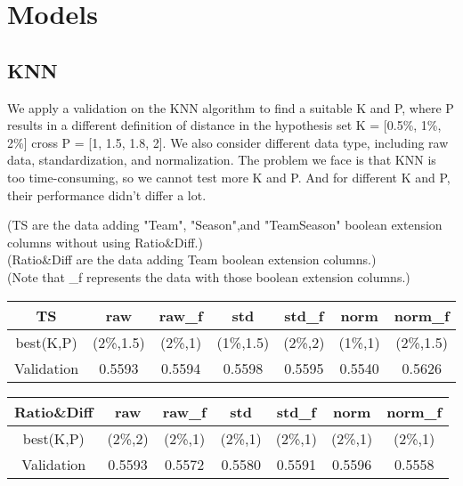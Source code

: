 \section{Models}
\subsection*{KNN}

\quad We apply a validation on the KNN algorithm to find a suitable K and P, where P results in a different definition of distance in the hypothesis set K = [0.5\%, 1\%, 2\%] cross P = [1, 1.5, 1.8, 2]. We also consider different data type, including raw data, standardization, and normalization. The problem we face is that KNN is too time-consuming, so we cannot test more K and P. And for different K and P, their performance didn't differ a lot.

\noindent
(TS are the data adding "Team", "Season",and "TeamSeason" boolean extension columns without using Ratio\&Diff.) \\
(Ratio\&Diff are the data adding Team boolean extension columns.) \\
(Note that \_f represents the data with those boolean extension columns.)

\vspace{6pt}

\begin{tabular}{|c|c|c|c|c|c|c|}
    \hline
    TS & raw & raw\_f & std & std\_f & norm & norm\_f \\\hline
    best(K,P) & (2\%,1.5) & (2\%,1) & (1\%,1.5) & (2\%,2) & (1\%,1) & (2\%,1.5)\\\hline
    Validation & 0.5593 & 0.5594 & 0.5598 & 0.5595 & 0.5540 & 0.5626\\\hline
\end{tabular}

\vspace{12pt}

\begin{tabular}{|c|c|c|c|c|c|c|}
    \hline
    Ratio\&Diff & raw & raw\_f & std & std\_f & norm & norm\_f \\\hline
    best(K,P) & (2\%,2) & (2\%,1) & (2\%,1) & (2\%,1) & (2\%,1) & (2\%,1)\\\hline
    Validation & 0.5593 & 0.5572 & 0.5580 & 0.5591 & 0.5596 & 0.5558\\\hline
\end{tabular}